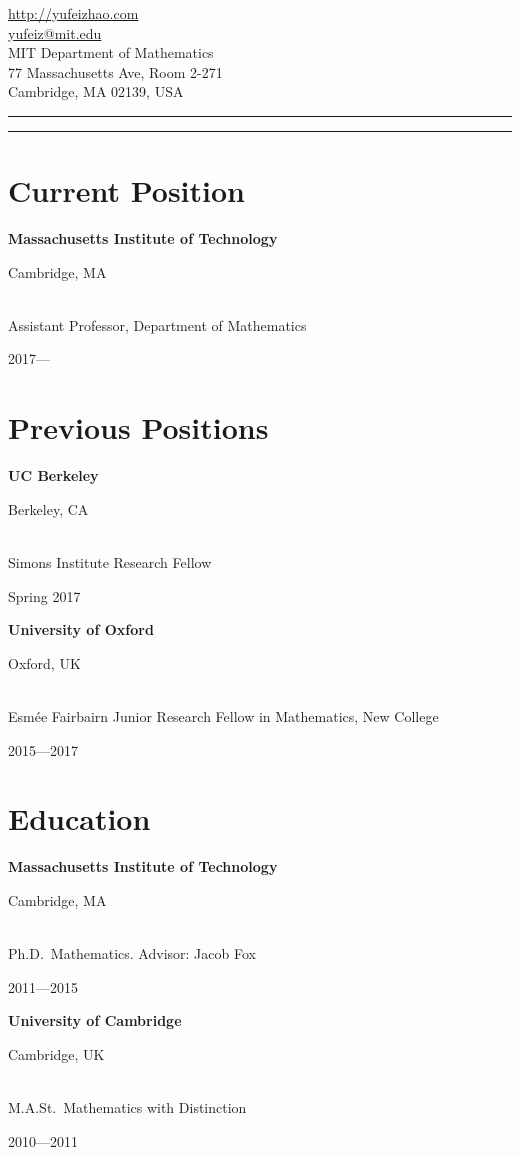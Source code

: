 \documentclass[11pt]{amsart}
\newcommand{\blue}{\color{darkblue}}
\newcommand{\rightloc}[1]{\hfill {\raggedright #1}}
\newcommand{\rightdate}[1]{\hfill {\raggedright #1}}
\newcommand{\p}[1]{{\bfseries #1}}
\newcommand{\q}{\null\quad}
\begin{document}
\thispagestyle{empty}


\parbox{.5\textwidth}{\scalebox{3}{\sffamily\bfseries Yufei Zhao}}
\hfill
\parbox{.5\textwidth}
{  \begin{flushright} \small
\url{http://yufeizhao.com} \\
\url{yufeiz@mit.edu} 
\\[2pt] \footnotesize
MIT Department of Mathematics \\
77 Massachusetts Ave, Room 2-271 \\  
Cambridge, MA 02139, USA
\end{flushright}
}

\vspace{12pt}

{\blue
\hrule
\vspace{0.02in}
\hrule
}

\section*{Current Position}

\p{Massachusetts Institute of Technology} \rightloc{Cambridge, MA} \\
\null\quad Assistant Professor, Department of Mathematics \rightdate{2017---\phantom{2020}}

\section*{Previous Positions}

\textbf{UC Berkeley} \rightloc{Berkeley, CA} \\
\q Simons Institute Research Fellow \rightdate{Spring 2017}

\p{University of Oxford} \rightloc{Oxford, UK} \\
\q Esm\'ee Fairbairn Junior Research Fellow in Mathematics, New College  \rightdate{2015---2017}

\section*{Education}

\p{Massachusetts Institute of Technology} \rightloc{Cambridge, MA}\\
\q Ph.D.~Mathematics. Advisor: Jacob Fox
\rightdate{2011---2015}

\p{University of Cambridge} \rightloc{Cambridge, UK} \\
\q M.A.St.~Mathematics with Distinction \rightdate{2010---2011}
\end{document}
